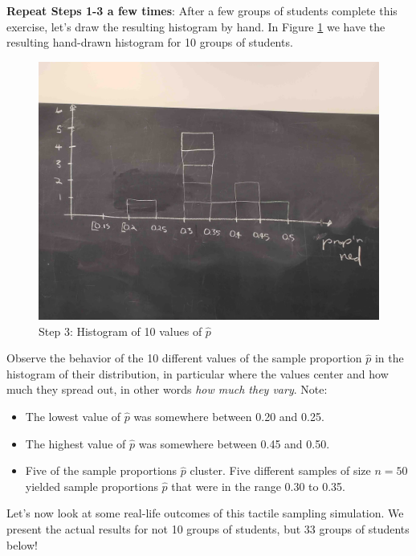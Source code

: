 \documentclass[12pt,]{krantz}
\providecommand{\tightlist}{%
  \setlength{\itemsep}{0pt}\setlength{\parskip}{0pt}}
\begin{document}
\textbf{Repeat Steps 1-3 a few times}: After a few groups of students
complete this exercise, let's draw the resulting histogram by hand. In
Figure \ref{fig:tactile4} we have the resulting hand-drawn histogram for
10 groups of students.

\begin{figure}

{\centering \includegraphics[width=0.8\linewidth]{images/sampling/tactile_3_c} 

}

\caption{Step 3: Histogram of 10 values of $\widehat{p}$}\label{fig:tactile4}
\end{figure}

Observe the behavior of the 10 different values of the sample proportion
\(\widehat{p}\) in the histogram of their distribution, in particular
where the values center and how much they spread out, in other words
\emph{how much they vary}. Note:

\begin{itemize}
\tightlist
\item
  The lowest value of \(\widehat{p}\) was somewhere between 0.20 and
  0.25.
\item
  The highest value of \(\widehat{p}\) was somewhere between 0.45 and
  0.50.
\item
  Five of the sample proportions \(\widehat{p}\) cluster. Five different
  samples of size \(n=50\) yielded sample proportions \(\widehat{p}\)
  that were in the range 0.30 to 0.35.
\end{itemize}

Let's now look at some real-life outcomes of this tactile sampling
simulation. We present the actual results for not 10 groups of students,
but 33 groups of students below!
\end{document}
